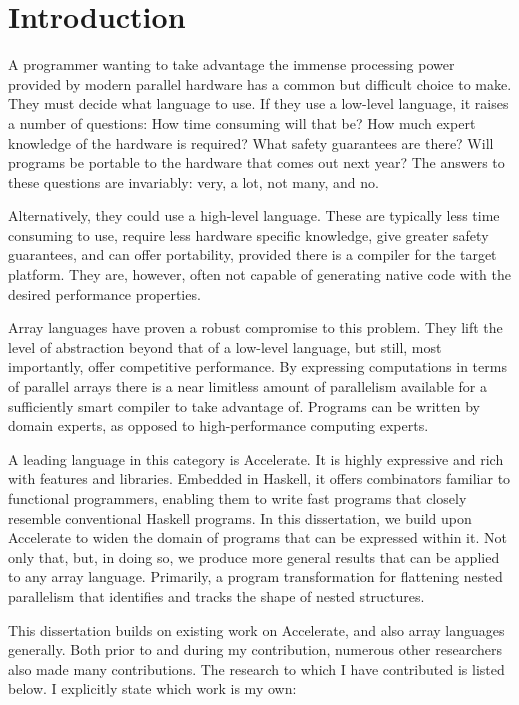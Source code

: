 \chapter{Introduction}

A programmer wanting to take advantage the immense processing power provided by modern parallel hardware has a common but difficult choice to make. They must decide what language to use. If they use a low-level language, it raises a number of questions: How time consuming will that be? How much expert knowledge of the hardware is required?  What safety guarantees are there? Will programs be portable to the hardware that comes out next year? The answers to these questions are invariably: very, a lot, not many, and no.

Alternatively, they could use a high-level language. These are typically less time consuming to use, require less hardware specific knowledge, give greater safety guarantees, and can offer portability, provided there is a compiler for the target platform. They are, however, often not capable of generating native code with the desired performance properties.

Array languages have proven a robust compromise to this problem. They lift the level of abstraction beyond that of a low-level language, but still, most importantly, offer competitive performance. By expressing computations in terms of parallel arrays there is a near limitless amount of parallelism available for a sufficiently smart compiler to take advantage of. Programs can be written by domain experts, as opposed to high-performance computing experts.

A leading language in this category is Accelerate. It is highly expressive and rich with features and libraries. Embedded in Haskell, it offers combinators familiar to functional programmers, enabling them to write fast programs that closely resemble conventional Haskell programs. In this dissertation, we build upon Accelerate to widen the domain of programs that can be expressed within it. Not only that, but, in doing so, we produce more general results that can be applied to any array language. Primarily, a program transformation for flattening nested parallelism that identifies and tracks the shape of nested structures.

This dissertation builds on existing work on Accelerate, and also array languages generally. Both prior to and during my contribution, numerous other researchers also made many contributions. The research to which I have contributed is listed below. I explicitly state which work is my own:

